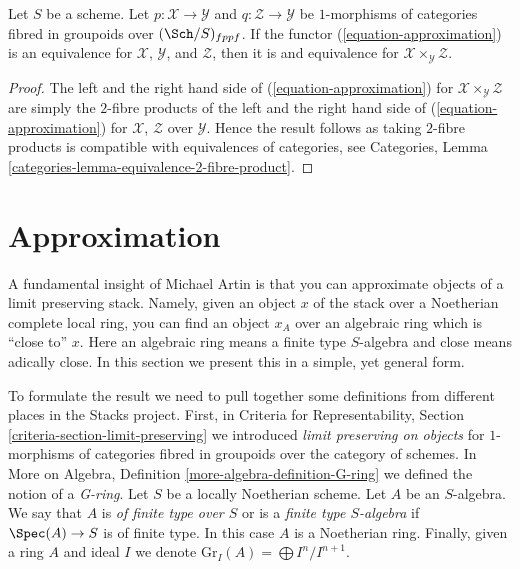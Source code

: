 \begin{lemma}
\label{lemma-fibre-product-effective}
Let $S$ be a scheme. Let $p : \mathcal{X} \to \mathcal{Y}$ and
$q : \mathcal{Z} \to \mathcal{Y}$ be $1$-morphisms of categories
fibred in groupoids over $(\Sch/S)_{fppf}$. If the functor
(\ref{equation-approximation}) is an equivalence for 
$\mathcal{X}$, $\mathcal{Y}$, and $\mathcal{Z}$, then it is 
and equivalence for $\mathcal{X} \times_\mathcal{Y} \mathcal{Z}$.
\end{lemma}

\begin{proof}
The left and the right hand side of (\ref{equation-approximation})
for $\mathcal{X} \times_\mathcal{Y} \mathcal{Z}$ are simply the $2$-fibre
products of the left and the right hand side of (\ref{equation-approximation})
for $\mathcal{X}$, $\mathcal{Z}$ over $\mathcal{Y}$.
Hence the result follows as taking $2$-fibre products is compatible
with equivalences of categories, see
Categories, Lemma \ref{categories-lemma-equivalence-2-fibre-product}.
\end{proof}






\section{Approximation}
\label{section-approximation}

\noindent
A fundamental insight of Michael Artin is that you can approximate
objects of a limit preserving stack. Namely, given an object $x$
of the stack over a Noetherian complete local ring, you can find
an object $x_A$ over an algebraic ring which is ``close to'' $x$.
Here an algebraic ring means a finite type $S$-algebra and close
means adically close. In this section we present this in a simple,
yet general form.

\medskip\noindent
To formulate the result we need to pull together some definitions from
different places in the Stacks project. First, in
Criteria for Representability, Section \ref{criteria-section-limit-preserving}
we introduced {\it limit preserving on objects} for $1$-morphisms
of categories fibred in groupoids over the category of schemes.
In More on Algebra, Definition \ref{more-algebra-definition-G-ring}
we defined the notion of a {\it G-ring}. Let $S$ be a locally Noetherian scheme.
Let $A$ be an $S$-algebra. We say that $A$ is {\it of finite type over $S$}
or is a {\it finite type $S$-algebra} if $\Spec(A) \to S$ is of finite type.
In this case $A$ is a Noetherian ring. Finally, given a ring $A$ and ideal
$I$ we denote $\text{Gr}_I(A) = \bigoplus I^n/I^{n + 1}$.

